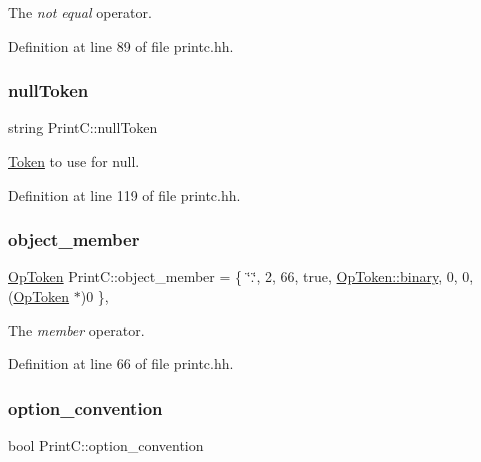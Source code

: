 The {\itshape not} {\itshape equal} operator. 



Definition at line 89 of file printc.\+hh.

\mbox{\label{class_print_c_a1bf3bef78d048160d91639467b0c9278}} 
\subsubsection{\texorpdfstring{nullToken}{nullToken}}
{\footnotesize\ttfamily string Print\+C\+::null\+Token\hspace{0.3cm}{\ttfamily [protected]}}



\mbox{\hyperlink{class_token}{Token}} to use for \textquotesingle{}null\textquotesingle{}. 



Definition at line 119 of file printc.\+hh.

\mbox{\label{class_print_c_acd4bf9c86c5ffd796e010a71bcb697ae}} 
\subsubsection{\texorpdfstring{object\_member}{object\_member}}
{\footnotesize\ttfamily \mbox{\hyperlink{class_op_token}{Op\+Token}} Print\+C\+::object\+\_\+member = \{ \char`\"{}.\char`\"{}, 2, 66, true, \mbox{\hyperlink{class_op_token_af41c7f108d5662ede7765c5a6c44eaffa3a2ec63522a9329a71ddbe8adc3e752d}{Op\+Token\+::binary}}, 0, 0, (\mbox{\hyperlink{class_op_token}{Op\+Token}} $\ast$)0 \}\hspace{0.3cm}{\ttfamily [static]}, {\ttfamily [protected]}}



The {\itshape member} operator. 



Definition at line 66 of file printc.\+hh.

\mbox{\label{class_print_c_aa95a4d17b93d7d1f2cf29d013613a5ad}} 
\subsubsection{\texorpdfstring{option\_convention}{option\_convention}}
{\footnotesize\ttfamily bool Print\+C\+::option\+\_\+convention\hspace{0.3cm}{\ttfamily [protected]}}



